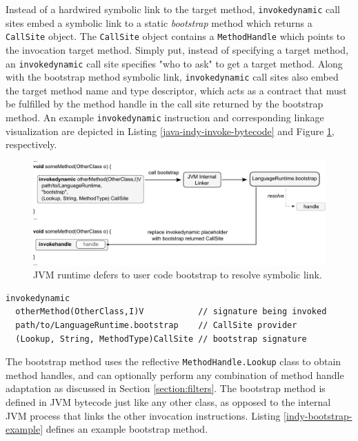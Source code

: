 Instead of a hardwired symbolic link to the target method, \texttt{invokedynamic} call sites embed a symbolic link to a static \emph{bootstrap} method which returns a \texttt{CallSite} object.  The \texttt{CallSite} object contains a \texttt{MethodHandle} which points to the invocation target method.  Simply put, instead of specifying a target method, an \texttt{invokedynamic} call site specifies "who to ask" to get a target method.  Along with the bootstrap method symbolic link, \texttt{invokedynamic} call sites also embed the target method name and type descriptor, which acts as a contract that must be fulfilled by the method handle in the call site returned by the bootstrap method.  An example \texttt{invokedynamic} instruction and corresponding linkage visualization are depicted in Listing \ref{java-indy-invoke-bytecode} and Figure \ref{fig:linking-invokedynamic}, respectively.
\vspace{2em}
\begin{figure}[htbp]
	\centering
    \includegraphics[width=\textwidth]{./Figures/linking-indy-bootstrap.pdf}
	\caption[invokedynamic Linking]{JVM runtime defers to user code bootstrap to resolve symbolic link.}
  \label{fig:linking-invokedynamic}
\end{figure}
\vspace{2em}
\begin{lstlisting}[language=jvm-bytecode,caption=dynamic invocation bytecode,label=java-indy-invoke-bytecode]
invokedynamic
  otherMethod(OtherClass,I)V           // signature being invoked
  path/to/LanguageRuntime.bootstrap    // CallSite provider
  (Lookup, String, MethodType)CallSite // bootstrap signature
\end{lstlisting}

The bootstrap method uses the reflective \texttt{MethodHandle.Lookup} class to obtain method handles, and can optionally perform any combination of method handle adaptation as discussed in Section \ref{section:filters}.  The bootstrap method is defined in JVM bytecode just like any other class, as opposed to the internal JVM process that links the other invocation instructions.  Listing \ref{indy-bootstrap-example} defines an example bootstrap method.

